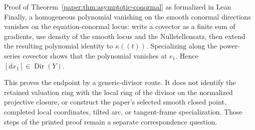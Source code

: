 \documentclass[11pt]{amsart}
\numberwithin{equation}{section}
\theoremstyle{plain}
\theoremstyle{remark}
\begin{document}
\begin{AIaddition}{Proof of Theorem~\ref{paper:thm:asymptotic-conormal} as formalized in Lean}
Finally, a homogeneous polynomial vanishing on the smooth conormal directions
vanishes on the equation-conormal locus: write a covector as a finite sum of
gradients, use density of the smooth locus and the Nullstellensatz, then extend
the resulting polynomial identity to $\kappa((t))$. Specializing along the
power-series covector shows that the polynomial vanishes at $e_1$. Hence
$[dx_1]\in\operatorname{Dir}(Y)$.

This proves the endpoint by a generic-divisor route. It does not identify the
retained valuation ring with the local ring of the divisor on the normalized
projective closure, or construct the paper's selected smooth closed point,
completed local coordinates, tilted arc, or tangent-frame specialization.
Those steps of the printed proof remain a separate correspondence question.
\end{AIaddition}
\end{document}
